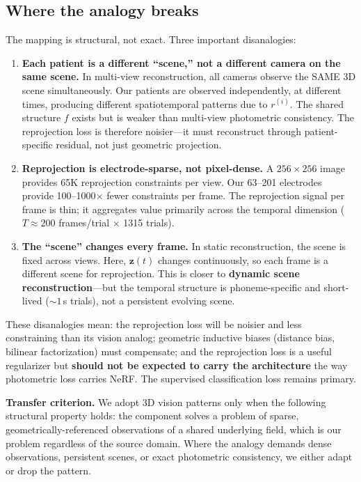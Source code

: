 \documentclass[11pt,letterpaper]{article}
\newcommand{\bfz}{\mathbf{z}}
\begin{document}
\subsection{Where the analogy breaks}\label{sec:disanalogies}

The mapping is structural, not exact. Three important disanalogies:

\begin{enumerate}[leftmargin=2em]
\item \textbf{Each patient is a different ``scene,'' not a different camera on the same scene.} In multi-view reconstruction, all cameras observe the SAME 3D scene simultaneously. Our patients are observed independently, at different times, producing different spatiotemporal patterns due to $r^{(i)}$. The shared structure $f$ exists but is weaker than multi-view photometric consistency. The reprojection loss is therefore noisier---it must reconstruct through patient-specific residual, not just geometric projection.

\item \textbf{Reprojection is electrode-sparse, not pixel-dense.} A $256{\times}256$ image provides 65K reprojection constraints per view. Our 63--201 electrodes provide 100--1000$\times$ fewer constraints per frame. The reprojection signal per frame is thin; it aggregates value primarily across the temporal dimension ($T {\approx} 200$ frames/trial $\times$ 1315 trials).

\item \textbf{The ``scene'' changes every frame.} In static reconstruction, the scene is fixed across views. Here, $\bfz(t)$ changes continuously, so each frame is a different scene for reprojection. This is closer to \textbf{dynamic scene reconstruction}---but the temporal structure is phoneme-specific and short-lived (${\sim}1$\,s trials), not a persistent evolving scene.
\end{enumerate}

\noindent These disanalogies mean: the reprojection loss will be noisier and less constraining than its vision analog; geometric inductive biases (distance bias, bilinear factorization) must compensate; and the reprojection loss is a useful regularizer but \textbf{should not be expected to carry the architecture} the way photometric loss carries NeRF. The supervised classification loss remains primary.

\textbf{Transfer criterion.} We adopt 3D vision patterns only when the following structural property holds: the component solves a problem of sparse, geometrically-referenced observations of a shared underlying field, which is our problem regardless of the source domain. Where the analogy demands dense observations, persistent scenes, or exact photometric consistency, we either adapt or drop the pattern.
\end{document}
